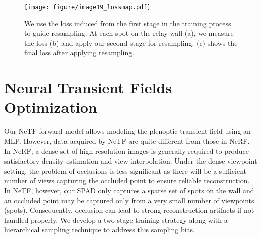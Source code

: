 \documentclass[10pt,journal,compsoc]{IEEEtran}
\begin{document}





 

\begin{figure}[!t]
\centering
\texttt{[image: figure/image19\_lossmap.pdf]}
\caption{We use the loss induced from the first stage in the training process to guide resampling. At each spot on the relay wall (a), we measure the loss (b) and apply our second stage for resampling. (c) shows the final loss after applying resampling.}
\label{Loss}
\end{figure}

\section{Neural Transient Fields Optimization}

Our NeTF forward model allows modeling the plenoptic transient field using an MLP. However, data acquired by NeTF are quite different from those in NeRF. In NeRF, a dense set of high resolution images is generally required to produce satisfactory density estimation and view interpolation. Under the dense viewpoint setting, the problem of occlusions is less significant as there will be a sufficient number of views capturing the occluded point to ensure reliable reconstruction. In NeTF, however, our SPAD only captures a sparse set of spots on the wall and an occluded point may be captured only from a very small number of viewpoints (spots). Consequently, occlusion can lead to strong reconstruction artifacts if not handled properly. We develop a two-stage training strategy along with a hierarchical sampling technique to address this sampling bias. 
\end{document}
